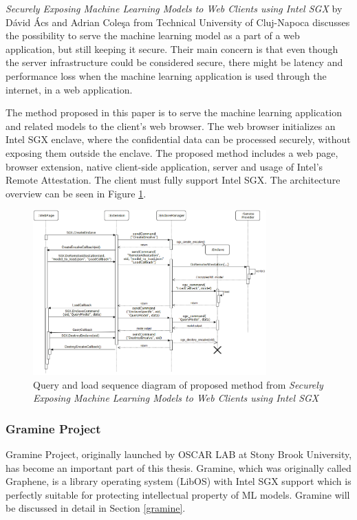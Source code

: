 \textit{Securely Exposing Machine Learning Models to Web Clients using Intel SGX} by Dávid Ács and Adrian Coleşa from Technical University of Cluj-Napoca discusses the possibility to serve the machine learning model as a part of a web application, but still keeping it secure. Their main concern is that even though the server infrastructure could be considered secure, there might be latency and performance loss when the machine learning application is used through the internet, in a web application.

The method proposed in this paper is to serve the machine learning application and related models to the client's web browser. The web browser initializes an Intel SGX enclave, where the confidential data can be processed securely, without exposing them outside the enclave. The proposed method includes a web page, browser extension, native client-side application, server and usage of Intel's Remote Attestation. The client must fully support Intel SGX. The architecture overview can be seen in Figure \ref{img:websgx}.

\begin{figure}
\centering \includegraphics[width=0.8\textwidth]{img/websgx}
\caption{Query and load sequence diagram of proposed method from \textit{Securely Exposing Machine Learning Models to Web Clients using Intel SGX}}
\label{img:websgx} 
\end{figure}

\subsubsection{Gramine Project} \label{prevgramine}

Gramine Project, originally launched by OSCAR LAB at Stony Brook University, has become an important part of this thesis. Gramine, which was originally called Graphene, is a library operating system (LibOS) with Intel SGX support which is perfectly suitable for protecting intellectual property of ML models. Gramine will be discussed in detail in Section \ref{gramine}.

